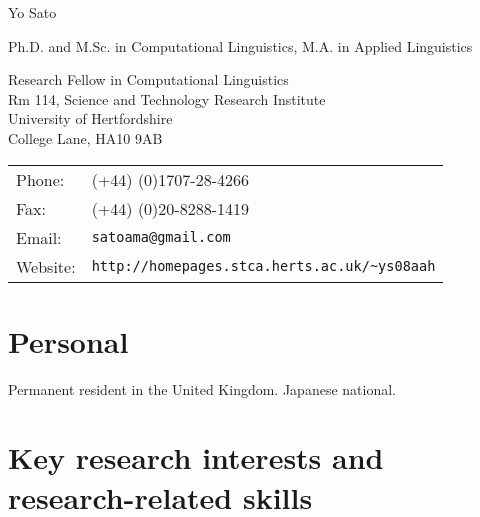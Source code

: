 \documentclass[a4paper]{article}
\def\name{Yo Sato}
\renewenvironment{itemize}{
  \begin{list}{}{
    \setlength{\leftmargin}{1.5em}
  }
}{
  \end{list}
}
\begin{document}

{\huge \name}

\smallskip

Ph.D. and M.Sc. in Computational Linguistics, M.A. in Applied Linguistics


\vspace{0.25in}

\begin{minipage}{0.5\linewidth}
  Research Fellow in Computational Linguistics\\
  Rm 114, Science and Technology Research Institute \\
  University of Hertfordshire \\
  College Lane, HA10 9AB
\end{minipage}
\begin{minipage}{0.45\linewidth}
  \begin{tabular}{ll}
    Phone: & (+44) (0)1707-28-4266 \\
    Fax: &  (+44) (0)20-8288-1419 \\
    Email: & {\tt satoama@gmail.com} \\
    Website: & {\tt\small http://homepages.stca.herts.ac.uk/\textasciitilde{}ys08aah} \\
  \end{tabular}
\end{minipage}

\section*{Personal}

\begin{itemize}
\item Permanent resident in the United Kingdom. Japanese national.
\end{itemize}

\section*{Key research interests and research-related skills}
\end{document}
